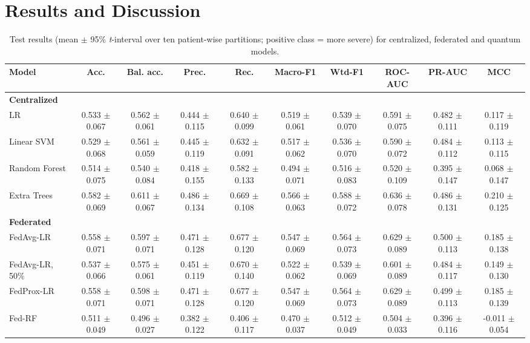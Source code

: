 \documentclass[conference,a4paper]{IEEEtran}
\begin{document}
\section{Results and Discussion}
\begin{table}[!t]\centering\caption{Test results (mean $\pm$ 95\% \textit{t}-interval over ten patient-wise partitions; positive class = more severe) for centralized, federated and quantum models.}\label{tab:res}\scriptsize\setlength{\tabcolsep}{2.5pt}
\begin{tabular}{lccccccccc}\toprule
Model & Acc. & Bal. acc. & Prec. & Rec. & Macro-F1 & Wtd-F1 & ROC-AUC & PR-AUC & MCC\\\midrule
\midrule
\textbf{Centralized} &  &  &  &  &  &  &  &  & \\
LR & 0.533 $\pm$ 0.067 & 0.562 $\pm$ 0.061 & 0.444 $\pm$ 0.115 & 0.640 $\pm$ 0.099 & 0.519 $\pm$ 0.061 & 0.539 $\pm$ 0.070 & 0.591 $\pm$ 0.075 & 0.482 $\pm$ 0.111 & 0.117 $\pm$ 0.119\\
Linear SVM & 0.529 $\pm$ 0.068 & 0.561 $\pm$ 0.059 & 0.445 $\pm$ 0.119 & 0.632 $\pm$ 0.091 & 0.517 $\pm$ 0.062 & 0.536 $\pm$ 0.070 & 0.590 $\pm$ 0.072 & 0.484 $\pm$ 0.112 & 0.113 $\pm$ 0.115\\
Random Forest & 0.514 $\pm$ 0.075 & 0.540 $\pm$ 0.084 & 0.418 $\pm$ 0.155 & 0.582 $\pm$ 0.133 & 0.494 $\pm$ 0.071 & 0.516 $\pm$ 0.083 & 0.520 $\pm$ 0.109 & 0.395 $\pm$ 0.147 & 0.068 $\pm$ 0.147\\
Extra Trees & 0.582 $\pm$ 0.069 & 0.611 $\pm$ 0.067 & 0.486 $\pm$ 0.134 & 0.669 $\pm$ 0.108 & 0.566 $\pm$ 0.063 & 0.588 $\pm$ 0.072 & 0.636 $\pm$ 0.078 & 0.486 $\pm$ 0.131 & 0.210 $\pm$ 0.125\\
\midrule
\textbf{Federated} &  &  &  &  &  &  &  &  & \\
FedAvg-LR & 0.558 $\pm$ 0.071 & 0.597 $\pm$ 0.071 & 0.471 $\pm$ 0.128 & 0.677 $\pm$ 0.120 & 0.547 $\pm$ 0.069 & 0.564 $\pm$ 0.073 & 0.629 $\pm$ 0.089 & 0.500 $\pm$ 0.113 & 0.185 $\pm$ 0.138\\
FedAvg-LR, 50\% & 0.537 $\pm$ 0.066 & 0.575 $\pm$ 0.061 & 0.451 $\pm$ 0.119 & 0.670 $\pm$ 0.140 & 0.522 $\pm$ 0.062 & 0.539 $\pm$ 0.069 & 0.601 $\pm$ 0.089 & 0.484 $\pm$ 0.117 & 0.149 $\pm$ 0.130\\
FedProx-LR & 0.558 $\pm$ 0.071 & 0.598 $\pm$ 0.071 & 0.471 $\pm$ 0.128 & 0.677 $\pm$ 0.120 & 0.547 $\pm$ 0.069 & 0.564 $\pm$ 0.073 & 0.629 $\pm$ 0.089 & 0.499 $\pm$ 0.113 & 0.185 $\pm$ 0.139\\
Fed-RF & 0.511 $\pm$ 0.049 & 0.496 $\pm$ 0.027 & 0.382 $\pm$ 0.122 & 0.406 $\pm$ 0.117 & 0.470 $\pm$ 0.037 & 0.512 $\pm$ 0.049 & 0.504 $\pm$ 0.033 & 0.396 $\pm$ 0.116 & -0.011 $\pm$ 0.054\\

\end{tabular}
\end{table}
\end{document}
